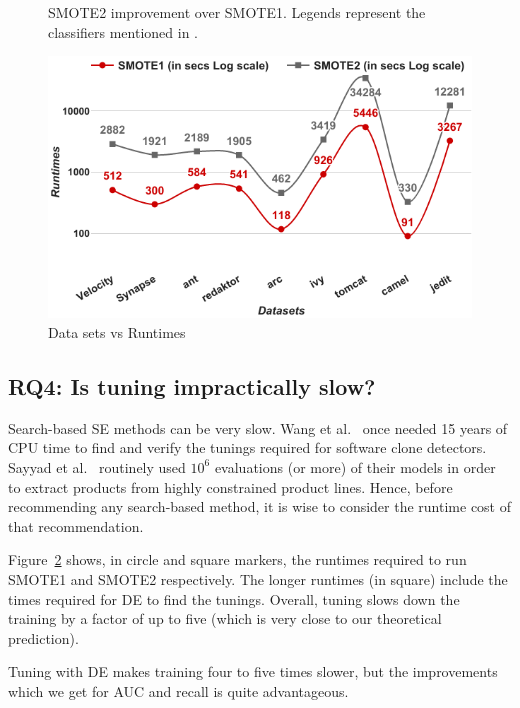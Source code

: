 \begin{figure}[!t]
    \caption{SMOTE2 improvement over SMOTE1. Legends represent the classifiers mentioned in .}
    \vspace{-10pt}
    \label{fig:auc}
\end{figure}

\begin{figure}[!t]
  \captionsetup{justification=centering}
  \includegraphics[width=\linewidth]{./fig/runtimes.png}
  \caption{Data sets vs Runtimes}
  \label{runtime}
\end{figure} 

\subsection{\textbf{RQ4: Is tuning impractically slow?}}

Search-based SE methods can be very slow. Wang et al.~\cite{wang2013searching} once needed 15
years of CPU time to find and verify the tunings required for software
clone detectors. Sayyad et al.~\cite{sayyad2013scalable} routinely used
$10^6$ evaluations (or more) of their models in order to extract
products from highly constrained product
lines. Hence, before recommending any
search-based method, it is wise to consider the runtime cost of that
recommendation.

 Figure~\ref{runtime} shows,  in circle and square markers, the
  runtimes required to run SMOTE1 and SMOTE2 respectively.  The
  longer runtimes (in square) include the times required for DE to find
  the tunings. Overall, tuning slows down the training by a factor of up to
  five (which is very close to our theoretical prediction).

\begin{lesson1}
    Tuning with DE makes training four to five times slower, but the improvements which we get for AUC and recall is quite advantageous.
\end{lesson1}
